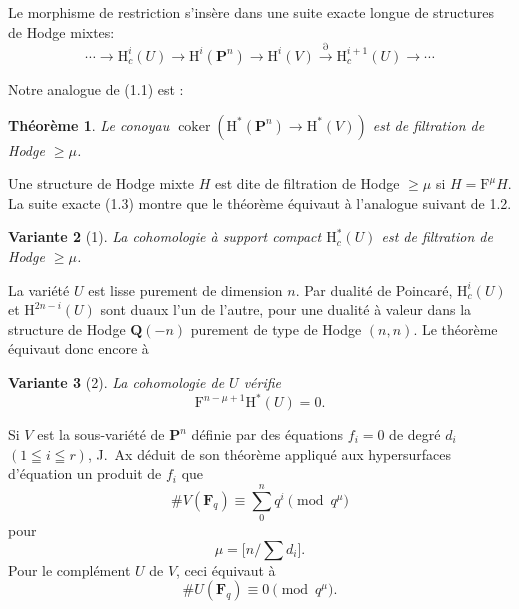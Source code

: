 \documentclass[12pt,a4paper]{article}
\theoremstyle{plain}
\newtheorem{theorem}{Théorème}
\newtheorem{variante}[theorem]{Variante}
\theoremstyle{definition}
\DeclareMathOperator{\Coker}{coker}
\begin{document}
Le morphisme de restriction s'insère dans une suite exacte longue de structures de Hodge mixtes:
\begin{equation}\label{eq:1.3}
\cdots \to \mathrm{H}_c^i(U) \to \mathrm{H}^i(\mathbf{P}^n) \to \mathrm{H}^i(V) \xrightarrow{\partial} \mathrm{H}_c^{i+1}(U) \to \cdots
\tag{1.3}
\end{equation}

Notre analogue de (1.1) est :

\begin{theorem}
Le conoyau $\Coker(\mathrm{H}^*(\mathbf{P}^n) \to \mathrm{H}^*(V))$ est de filtration de Hodge $\ge \mu$.
\end{theorem}

Une structure de Hodge mixte $H$ est dite de filtration de Hodge $\ge \mu$ si $H = \mathrm{F}^\mu H$. La suite exacte (1.3) montre que le théorème équivaut à l'analogue suivant de 1.2.

\begin{variante}[1]
La cohomologie à support compact $\mathrm{H}_c^*(U)$ est de filtration de Hodge $\ge \mu$.
\end{variante}

La variété $U$ est lisse purement de dimension $n$. Par dualité de Poincaré, $\mathrm{H}_c^i(U)$ et $\mathrm{H}^{2n-i}(U)$ sont duaux l'un de l'autre, pour une dualité à valeur dans la structure de Hodge $\mathbf{Q}(-n)$ purement de type de Hodge $(n,n)$. Le théorème équivaut donc encore à

\begin{variante}[2]
La cohomologie de $U$ vérifie
\begin{equation}\label{eq:1.4}
\mathrm{F}^{n-\mu+1} \mathrm{H}^*(U) = 0.
\tag{1.4}
\end{equation}
\end{variante}

Si $V$ est la sous-variété de $\mathbf{P}^n$ définie par des équations $f_i = 0$ de degré $d_i$ $(1 \leqq i \leqq r)$, J.\ Ax déduit de son théorème appliqué aux hypersurfaces d'équation un produit de $f_i$ que
\begin{equation}\label{eq:1.5}
\# V(\mathbf{F}_q) \equiv \sum_0^n q^i \pmod{q^\mu}
\tag{1.5}
\end{equation}
pour
\[
\mu = \bigl[n/\textstyle\sum d_i\bigr].
\]
Pour le complément $U$ de $V$, ceci équivaut à
\begin{equation}\label{eq:1.6}
\# U(\mathbf{F}_q) \equiv 0 \pmod{q^\mu}.
\tag{1.6}
\end{equation}
\end{document}

